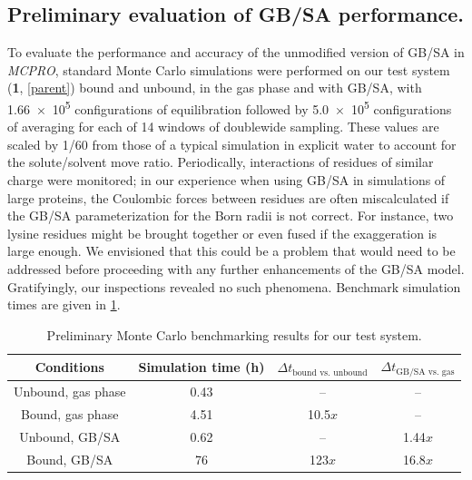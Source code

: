 \documentclass[12pt]{report}
\begin{document}
\subsection{Preliminary evaluation of GB/SA performance.}

To evaluate the performance and accuracy of the unmodified version of GB/SA in \textit{MCPRO}, standard Monte Carlo simulations were performed on our test system (\textbf{1}, \cref{parent}) bound and unbound, in the gas phase and with GB/SA, with \num{1.66e5} configurations of equilibration followed by \num{5.0e5} configurations of averaging for each of 14 windows of doublewide sampling. These values are scaled by 1/60 from those of a typical simulation in explicit water to account for the solute/solvent move ratio. Periodically, interactions of residues of similar charge were monitored; in our experience when using GB/SA in simulations of large proteins, the Coulombic forces between residues are often miscalculated if the GB/SA parameterization for the Born radii is not correct. For instance, two lysine residues might be brought together or even fused if the exaggeration is large enough. We envisioned that this could be a problem that would need to be addressed before proceeding with any further enhancements of the GB/SA model. Gratifyingly, our inspections revealed no such phenomena. Benchmark simulation times are given in \cref{prelim}. 

\begin{table}[htbp]
\centering
\caption{Preliminary Monte Carlo benchmarking results for our test system.}
\begin{tabular}{cccc}
\toprule
Conditions              & Simulation time (h) & $\Delta t_{\textrm{bound vs. unbound}}$ & $\Delta t_{\textrm{GB/SA vs.\ gas}}$ \\
\midrule
Unbound, gas phase      & 0.43                & --                                                     & --\\
Bound,   gas phase      & 4.51                & 10.5$x$                                                & --\\
Unbound, GB/SA          & 0.62                & --                                                     & 1.44$x$\\
Bound,   GB/SA          & 76                  & 123$x$                                                 & 16.8$x$\\
\bottomrule
\end{tabular}%
\label{prelim}%
\end{table}%
\end{document}
